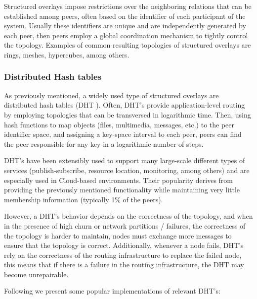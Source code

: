 Structured overlays impose restrictions over the neighboring relations that can be established among peers, often based on the identifier of each participant of the system. Usually these identifiers are unique and are independently generated by each peer, then peers employ a global coordination mechanism to tightly control the topology. Examples of common resulting topologies of structured overlays are rings, meshes, hypercubes, among others.

\subsubsection{Distributed Hash tables}

As previously mentioned, a widely used type of structured overlays are distributed hash tables (DHT
). Often, DHT's provide application-level routing by employing topologies that can be transversed in logarithmic time. Then, using hash functions to map objects (files, multimedia, messages, etc.) to the peer identifier space, and assigning a key-space interval to each peer, peers can find the peer responsible for any key in a logarithmic number of steps. 

DHT's have been extensibly used to support many large-scale different types of services (publish-subscribe, resource location, monitoring, among others) and are especially used in Cloud-based environments. Their popularity derives from providing the previously mentioned functionality while maintaining very little membership information (typically 1\% of the peers).

However, a DHT's behavior depends on the correctness of the topology, and when in the presence of high churn or network partitions / failures, the correctness of the topology is harder to maintain, nodes must exchange more messages to ensure that the topology is correct. Additionally, whenever a node fails, DHT's rely on the correctness of the routing infrastructure to replace the failed node,
this means that if there is a failure in the routing infrastructure, the DHT may become unrepairable.


Following we present some popular implementations of relevant DHT's:

